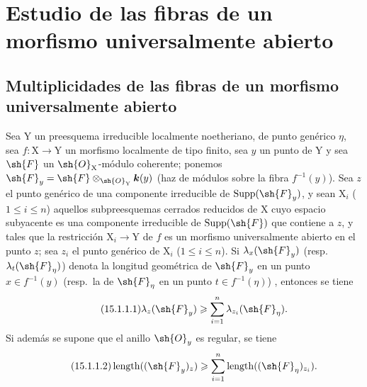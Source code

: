 \section{Estudio de las fibras de un morfismo universalmente abierto}
\label{section:IV.15}

\subsection{Multiplicidades de las fibras de un morfismo universalmente abierto}
\label{subsection:IV.15.1}

\begin{proposition}[15.1.1]
\label{IV.15.1.1}
Sea $\mathrm{Y}$ un preesquema irreducible localmente noetheriano, de punto genérico $\eta$, sea $f:\mathrm{X}\to\mathrm{Y}$ un morfismo localmente de tipo finito, sea $y$ un punto de $\mathrm{Y}$ y sea $\sh{F}$ un $\sh{O}_\mathrm{X}$-módulo coherente;
ponemos $\sh{F}_y=\sh{F}\otimes_{\sh{O}_\mathrm{Y}}\boldsymbol{k}(y)$ \textup{(haz de módulos sobre la fibra $f^{-1}(y)$)}.
Sea $z$ el punto genérico de una componente irreducible de $\operatorname{Supp}(\sh{F}_y)$, y sean $\mathrm{X}_i$ ($1\leqslant i\leqslant n$) aquellos subpreesquemas cerrados reducidos de $\mathrm{X}$ cuyo espacio subyacente es una componente irreducible de $\operatorname{Supp}(\sh{F})$ que contiene a $z$, y tales que la restricción $\mathrm{X}_i\to\mathrm{Y}$ de $f$ es un morfismo universalmente abierto en el punto $z$; sea $z_i$ el punto genérico de $\mathrm{X}_i$ ($1\leqslant i\leqslant n$).
Si $\lambda_x(\sh{F}_y)$ (\textup{resp.}~$\lambda_t(\sh{F}_\eta)$) denota la longitud geométrica de $\sh{F}_y$ en un punto $x\in f^{-1}(y)$ (\textup{resp.}~la de $\sh{F}_\eta$ en un punto $t\in f^{-1}(\eta)$) , entonces se tiene
\[
\tag{15.1.1.1}
\label{IV.15.1.1.1}
  \lambda_z(\sh{F}_y)\geqslant\sum_{i=1}^{n}\lambda_{z_i}(\sh{F}_\eta).
\]
Si además se supone que el anillo $\sh{O}_y$ es regular, se tiene
\[
\tag{15.1.1.2}
\label{IV.15.1.1.2}
  \operatorname{length}((\sh{F}_y)_z)\geqslant\sum_{i=1}^{n}\operatorname{length}((\sh{F}_\eta)_{z_i}).
\]
\end{proposition}

